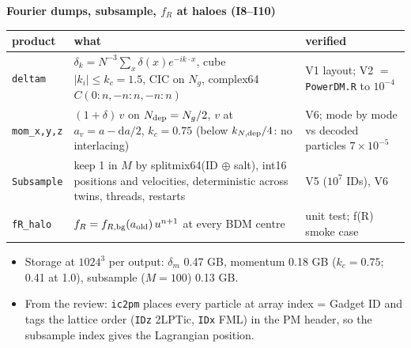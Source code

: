 \documentclass[UTF8]{beamer}
\begin{document}
\begin{frame}{\textbf{Fourier dumps, subsample, $f_R$ at haloes (I8--I10)}}
  \scriptsize
  \begin{tabularx}{\textwidth}{@{}l X l@{}}
    \toprule
    product & what & verified \\
    \midrule
    \texttt{deltam} & $\delta_k = N^{-3}\sum_x \delta(x)e^{-ik\cdot x}$, cube $|k_i| \le k_c = 1.5$, CIC on $N_g$,
      complex64 $C(0{:}n,-n{:}n,-n{:}n)$ & V1 layout; V2 $=$ \texttt{PowerDM.R} to $10^{-4}$ \\
    \texttt{mom\_x,y,z} & $(1+\delta)\,v$ on $N_{\rm dep} = N_g/2$, $v$ at $a_v = a - \mathrm{d}a/2$,
      $k_c = 0.75$ (below $k_{N,\rm dep}/4$: no interlacing) & V6; mode by mode vs decoded particles $7\times10^{-5}$ \\
    \texttt{Subsample} & keep 1 in $M$ by splitmix64(ID $\oplus$ salt), int16 positions and velocities,
      deterministic across twins, threads, restarts & V5 ($10^7$ IDs), V6 \\
    \texttt{fR\_halo} & $f_R = f_{R,\rm bg}(a_{\rm old})\,u^{n+1}$ at every BDM centre & unit test; f(R) smoke case \\
    \bottomrule
  \end{tabularx}
  \smallskip
  \small
  \begin{itemize}
    \item Storage at $1024^3$ per output: $\delta_m$ 0.47 GB, momentum 0.18 GB ($k_c = 0.75$; 0.41 at 1.0), subsample ($M=100$) 0.13 GB.
    \item From the review: \texttt{ic2pm} places every particle at array index = Gadget ID and tags the
      lattice order (\texttt{IDz} 2LPTic, \texttt{IDx} FML) in the PM header, so the subsample index gives
      the Lagrangian position.
  \end{itemize}
\end{frame}
\end{document}
